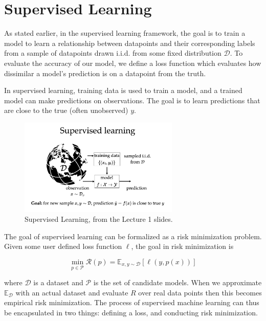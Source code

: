 \graphicspath{ {./1-supervised-learning/} }

\chapter{Supervised Learning}


As stated earlier, in the supervised learning framework, the goal is to train a model to learn a relationship between datapoints and their corresponding labels from a sample of datapoints drawn i.i.d. from some fixed distribution $\mathcal{D}$. To evaluate the accuracy of our model, we define a loss function which evaluates how dissimilar a model's prediction is on a datapoint from the truth.


In supervised learning, training data is used to train a model, and a trained model can make predictions on observations. The goal is to learn predictions that are close to the true (often unobserved) $y$.

\begin{figure}
\centering
\includegraphics[width=3in]{graphics/sup_learning.png}
\caption{Supervised Learning, from the Lecture 1 slides.}
\end{figure}

The goal of supervised learning can be formalized as a risk minimization problem.
Given some user defined loss function $\ell$, the goal in risk minimization is 

\begin{equation}
\min_{p \in \mathcal{P}} \mathcal{R}(p) = \mathbb{E}_{x, y \sim \mathcal{D}} [\ell(y, p(x))]
\end{equation}

where $\mathcal{D}$ is a dataset and $\mathcal{P}$ is the set of candidate models. When we approximate $\mathbb{E}_{\mathcal{D}}$ with an actual dataset and evaluate $R$ over real data points then this becomes empirical risk minimization.
The process of supervised machine learning can thus be encapsulated in two things: defining a loss, and conducting risk minimization. 

